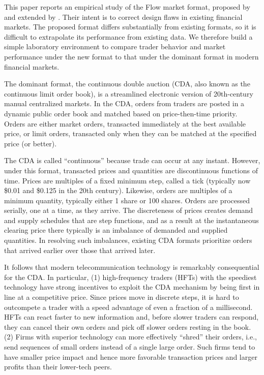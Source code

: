 This paper reports an empirical study of the Flow market format, proposed by \cite{Kyle2017} and extended by \cite{Budish2023}.
Their intent is to correct design flaws in existing financial markets. The proposed format differs substantially from existing formats,
so it is difficult to extrapolate its performance from existing data. 
We therefore build a simple laboratory environment to compare trader behavior and market performance under the new format to that under the dominant format in modern financial markets.

The dominant format, the continuous double auction (CDA, also known as the continuous limit order book), is a streamlined electronic version of 20th-century manual centralized markets. In the CDA, orders from traders are posted in a dynamic public order book and matched based on price-then-time priority. Orders are either market orders, transacted immediately at the best available price, or limit orders, transacted only when they can be matched at the specified price (or better). 

The CDA is called “continuous” because trade can occur at any instant. 
However, under this format, transacted prices and quantities are discontinuous functions of time. 
Prices are multiples of a fixed minimum step, called a tick (typically now \$0.01 and \$0.125 in the 20th century). 
Likewise, orders are multiples of a minimum quantity,
typically either 1 share or 100 shares. 
Orders are processed serially, one at a time, as they arrive. The discreteness of prices creates demand and supply schedules that are step functions, 
and as a result at the instantaneous clearing price there typically is an imbalance of demanded and supplied quantities. 
In resolving such imbalances,
existing CDA formats prioritize orders that arrived earlier over those that arrived later. 

It follows that modern telecommunication technology is remarkably consequential for the CDA. In particular,  
(1) high-frequency traders (HFTs) with the speediest technology have strong incentives to exploit the CDA mechanism by being first in line at a competitive price. Since prices move in discrete steps, it is hard to outcompete a trader with a speed advantage of even a fraction of a millisecond. 
HFTs can react faster to new information and, before slower traders can respond, they can cancel their own orders and pick off slower orders resting in the book. 
(2) Firms with superior technology can more effectively ``shred'' their orders, i.e., send sequences of small orders instead of a single large order.
Such firms tend to have smaller price impact and hence more favorable transaction prices and larger profits than their lower-tech peers. 

